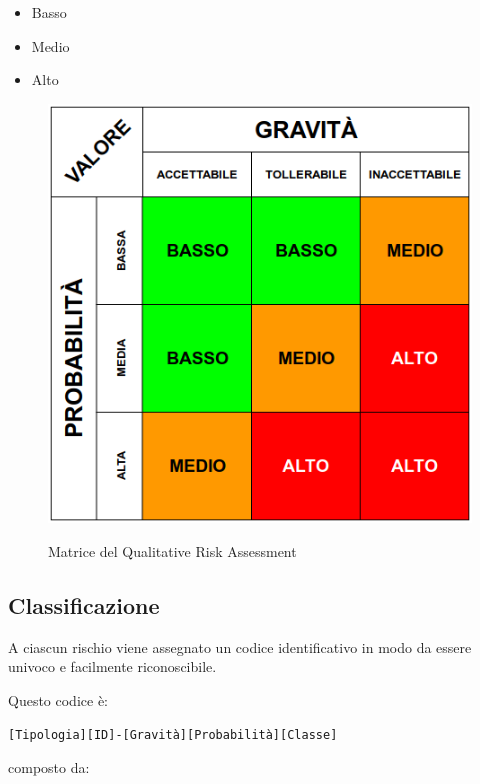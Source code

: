 	\begin{itemize}
		\item Basso
		\item Medio
		\item Alto
	\end{itemize}

	\begin{figure}[H]
		\centering
		\includegraphics[scale=0.5]{img/risk_assessment_table.png}\\
		\caption{Matrice del Qualitative Risk Assessment}
		\label{fig:rischi}
	\end{figure}

	\subsection{Classificazione}

	A ciascun rischio viene assegnato un codice identificativo in modo da essere univoco e facilmente riconoscibile.

	Questo codice è:

	\begin{center}
		\texttt{[Tipologia][ID]-[Gravità][Probabilità][Classe]}
	\end{center}

	composto da:
	
